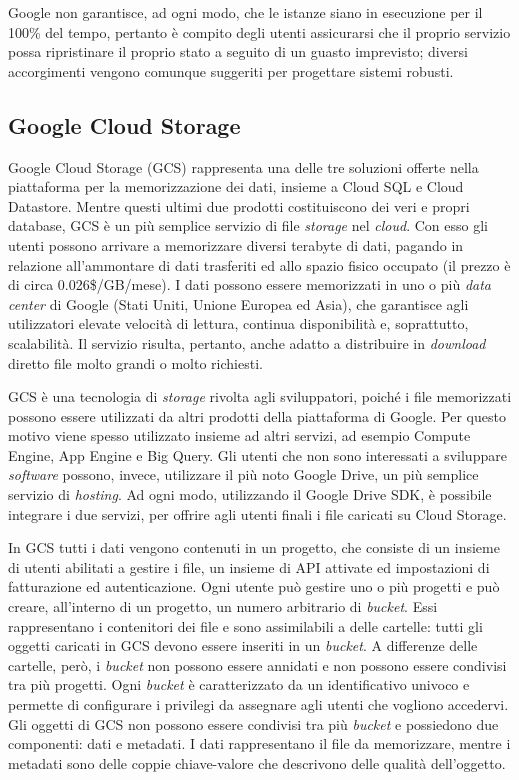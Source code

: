 Google non garantisce, ad ogni modo, che le istanze siano in esecuzione per il 100\% del tempo, pertanto è compito degli utenti assicurarsi che il proprio servizio possa 
ripristinare il proprio stato a seguito di un guasto imprevisto; diversi accorgimenti vengono comunque suggeriti per progettare sistemi robusti.

\subsection{Google Cloud Storage}

Google Cloud Storage (GCS) rappresenta una delle tre soluzioni offerte nella piattaforma per la memorizzazione dei dati, insieme a Cloud SQL e Cloud Datastore. Mentre questi ultimi
due prodotti costituiscono dei veri e propri database, GCS è un più semplice servizio di file \textit{storage} nel \textit{cloud}. Con esso gli utenti possono arrivare a memorizzare diversi terabyte 
di dati, pagando in relazione all’ammontare di dati trasferiti ed allo spazio fisico occupato (il prezzo è di circa 0.026\$/GB/mese). I dati possono essere memorizzati in uno 
o più \textit{data center} di Google (Stati Uniti, Unione Europea ed Asia), che garantisce agli utilizzatori elevate velocità di lettura, continua disponibilità e, soprattutto, scalabilità.
Il servizio risulta, pertanto, anche adatto a distribuire in \textit{download} diretto file molto grandi o molto richiesti.

GCS è una tecnologia di \textit{storage} rivolta agli sviluppatori, poiché i file memorizzati possono essere utilizzati da altri prodotti della piattaforma di Google. Per questo motivo 
viene spesso utilizzato insieme ad altri servizi, ad esempio Compute Engine, App Engine e Big Query. Gli utenti che non sono interessati a sviluppare \textit{software} possono, invece, 
utilizzare il più noto Google Drive, un più semplice servizio di \textit{hosting}. Ad ogni modo, utilizzando il Google Drive SDK, è possibile integrare i due servizi, per offrire agli 
utenti finali i file caricati su Cloud Storage.

In GCS tutti i dati vengono contenuti in un progetto, che consiste di un insieme di utenti abilitati a gestire i file, un insieme di API attivate ed impostazioni di fatturazione 
ed autenticazione. Ogni utente può gestire uno o più progetti e può creare, all’interno di un progetto, un numero arbitrario di \textit{bucket}. Essi rappresentano i contenitori dei file
e sono assimilabili a delle cartelle: tutti gli oggetti caricati in GCS devono essere inseriti in un \textit{bucket}. A differenze delle cartelle, però, i \textit{bucket} non possono essere annidati
e non possono essere condivisi tra più progetti. Ogni \textit{bucket} è caratterizzato da un identificativo univoco e permette di configurare i privilegi da assegnare agli utenti che 
vogliono accedervi. Gli oggetti di GCS non possono essere condivisi tra più \textit{bucket} e possiedono due componenti: dati e metadati. I dati rappresentano il file da memorizzare, 
mentre i metadati sono delle coppie chiave-valore che descrivono delle qualità dell’oggetto.

